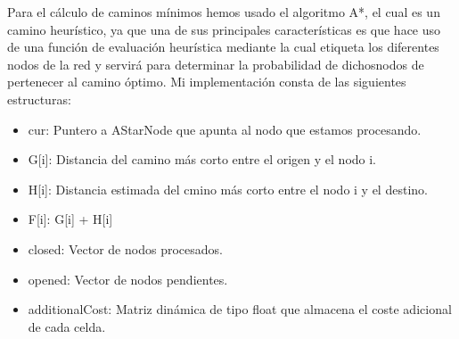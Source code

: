 Para el cálculo de caminos mínimos hemos usado el algoritmo A*, el cual es un camino heurístico, ya que una de sus principales características es que hace uso de una función de evaluación heurística mediante la cual etiqueta los diferentes nodos de la red y servirá para determinar la probabilidad de dichosnodos de pertenecer al camino óptimo.
Mi implementación consta de las siguientes estructuras:
\begin{itemize}
\item cur: Puntero a AStarNode que apunta al nodo que estamos procesando.
\item G[i]: Distancia del camino más corto entre el origen y el nodo i.
\item H[i]: Distancia estimada del cmino más corto entre el nodo i y el destino.
\item F[i]: G[i] + H[i]
\item closed: Vector de nodos procesados.
\item opened: Vector de nodos pendientes.
\item additionalCost: Matriz dinámica de tipo float que almacena el coste adicional de cada celda.
\end{itemize}